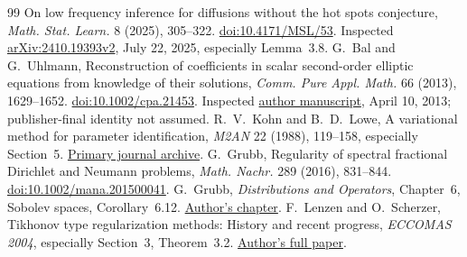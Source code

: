 \documentclass[11pt]{article}
\theoremstyle{remark}\newtheorem{remark}[theorem]{Remark}
\begin{document}
\begin{thebibliography}{99}
On low frequency inference for diffusions without the hot spots conjecture,
\emph{Math. Stat. Learn.} 8 (2025), 305--322.
\href{https://doi.org/10.4171/MSL/53}{doi:10.4171/MSL/53}.
Inspected \href{https://arxiv.org/abs/2410.19393v2}{arXiv:2410.19393v2},
July 22, 2025, especially Lemma~3.8.
 G.~Bal and G.~Uhlmann,
Reconstruction of coefficients in scalar second-order elliptic equations
from knowledge of their solutions, \emph{Comm. Pure Appl. Math.} 66 (2013),
1629--1652. \href{https://doi.org/10.1002/cpa.21453}{doi:10.1002/cpa.21453}.
Inspected \href{https://www.stat.uchicago.edu/~guillaumebal/PAPERS/Hybrid-Meas-u-12.pdf}{author manuscript},
April 10, 2013; publisher-final identity not assumed.
 R.~V.~Kohn and B.~D.~Lowe,
A variational method for parameter identification,
\emph{M2AN} 22 (1988), 119--158, especially Section~5.
\href{https://www.numdam.org/item/M2AN_1988__22_1_119_0/}{Primary journal archive}.
 G.~Grubb,
Regularity of spectral fractional Dirichlet and Neumann problems,
\emph{Math. Nachr.} 289 (2016), 831--844.
\href{https://doi.org/10.1002/mana.201500041}{doi:10.1002/mana.201500041}.
 G.~Grubb, \emph{Distributions and Operators},
Chapter~6, Sobolev spaces, Corollary~6.12.
\href{https://web.math.ku.dk/~grubb/dist6.pdf}{Author's chapter}.
 F.~Lenzen and O.~Scherzer,
Tikhonov type regularization methods: History and recent progress,
\emph{ECCOMAS 2004}, especially Section~3, Theorem~3.2.
\href{https://franklenzen.de/pdf/lenzen_scherzer_eccomas2004.pdf}{Author's full paper}.
\end{thebibliography}
\end{document}
